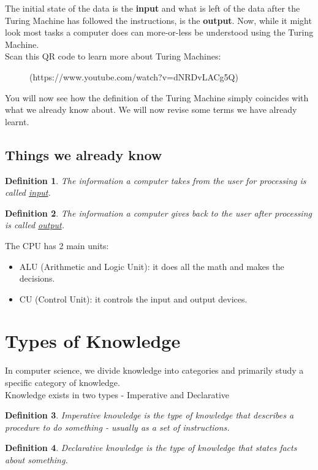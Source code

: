 \documentclass[letterpaper, 12pt]{book}
\newtheorem{definition}{Definition}
\begin{document}
The initial state of the data is the \textbf{input} and what is left of the data after the Turing Machine has followed the instructions, is the \textbf{output}.
Now, while it might look most tasks a computer does can more-or-less be understood using the Turing Machine.\\
Scan this QR code to learn more about Turing Machines:\\
\begin{figure}[h]
\centering
{}
\caption{(https://www.youtube.com/watch?v=dNRDvLACg5Q)}
\end{figure}
You will now see how the definition of the Turing Machine simply coincides with what we already know about. We will now revise some terms we have already learnt.
\subsection{Things we already know}
\begin{definition}
	The information a computer takes from the user for processing is called \underline{input}.
\end{definition}
\begin{definition}
	The information a computer gives back to the user after processing is called \underline{output}.
\end{definition}
The CPU has 2 main units:
\begin{itemize}
	\item ALU (Arithmetic and Logic Unit): it does all the math and makes the decisions.
	\item CU (Control Unit): it controls the input and output devices.
\end{itemize}
\section{Types of Knowledge}
In computer science, we divide knowledge into categories and primarily study a specific category of knowledge.\\
Knowledge exists in two types - Imperative and Declarative
\begin{definition}
Imperative knowledge is the type of knowledge that describes a procedure to do something - usually as a set of instructions.
\end{definition}
\begin{definition}
Declarative knowledge is the type of knowledge that states facts about something.
\end{definition}
\end{document}
